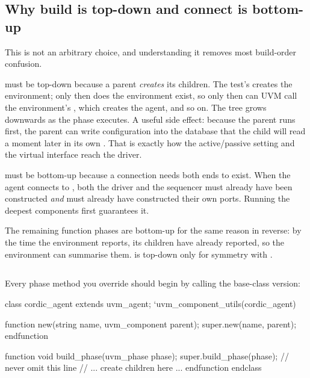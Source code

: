 \subsection{Why build is top-down and connect is bottom-up}
\label{sec:uvm:phase-order}

This is not an arbitrary choice, and understanding it removes most
build-order confusion.

 must be top-down because a parent \emph{creates} its
children. The test's  creates the environment; only then
does the environment exist, so only then can UVM call the environment's
, which creates the agent, and so on. The tree grows
downwards as the phase executes. A useful side effect: because the parent
runs first, the parent can write configuration into the database that the
child will read a moment later in its own . That is
exactly how the active/passive setting and the virtual interface reach the
driver.

 must be bottom-up because a connection needs both ends
to exist. When the agent connects  to
, both the driver and the sequencer must already
have been constructed \emph{and} must already have constructed their own
ports. Running the deepest components first guarantees it.

The remaining function phases are bottom-up for the same reason in reverse:
by the time the environment reports, its children have already reported, so
the environment can summarise them.  is top-down only for
symmetry with .

\subsection{}
\label{sec:uvm:super-build}

Every phase method you override should begin by calling the base-class
version:

\begin{uvmcode}[caption={The shape of every component},label={lst:uvm:shape}]
class cordic_agent extends uvm_agent;
  `uvm_component_utils(cordic_agent)

  function new(string name, uvm_component parent);
    super.new(name, parent);
  endfunction

  function void build_phase(uvm_phase phase);
    super.build_phase(phase);     // never omit this line
    // ... create children here ...
  endfunction
endclass
\end{uvmcode}

